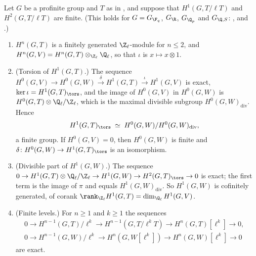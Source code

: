 \begin{proposition}\label{prop:galcoh:tvw}
Let $G$ be a profinite group and $T$ as in , and suppose that $H^1(G,T/\ell T)$ and $H^2(G,T/\ell T)$ are finite. (This holds for $G=G_{\F_q}$,
$G_\R$, $G_{\Q_p}$ and $G_{\Q,S}$: ,  and .)
\begin{enumerate}[label=(\roman*)]
\item $H^n(G,T)$ is a finitely generated $\Z_\ell$-module for $n\le2$, and $H^n(G,V)=H^n(G,T)\otimes_{\Z_\ell}\Q_\ell$, so that $\iota$ is $x\mapsto x\otimes1$.
\item (Torsion of $H^1(G,T)$.) The sequence $H^0(G,V)\to H^0(G,W)\xrightarrow{\ \delta\ }H^1(G,T)\xrightarrow{\ \iota\ }H^1(G,V)$ is exact, $\ker\iota=H^1(G,T)_{\tors}$, and the
image of $H^0(G,V)$ in $H^0(G,W)$ is $H^0(G,T)\otimes\Q_\ell/\Z_\ell$, which is the maximal divisible subgroup $H^0(G,W)_{\mathrm{div}}$. Hence
\[
H^1(G,T)_{\tors}\;\simeq\;H^0(G,W)/H^0(G,W)_{\mathrm{div}},
\]
a finite group. If $H^0(G,V)=0$, then $H^0(G,W)$ is finite and $\delta\colon H^0(G,W)\to H^1(G,T)_{\tors}$ is an isomorphism.
\item (Divisible part of $H^1(G,W)$.) The sequence $0\to H^1(G,T)\otimes\Q_\ell/\Z_\ell\to H^1(G,W)\to H^2(G,T)_{\tors}\to0$ is exact; the first term is the image of
$\pi$ and equals $H^1(G,W)_{\mathrm{div}}$. So $H^1(G,W)$ is cofinitely generated, of corank $\rank_{\Z_\ell}H^1(G,T)=\dim_{\Q_\ell}H^1(G,V)$.
\item (Finite levels.) For $n\ge1$ and $k\ge1$ the sequences
\begin{gather*}
0\to H^{n-1}(G,T)/\ell^k\to H^{n-1}(G,T/\ell^kT)\to H^n(G,T)[\ell^k]\to0,\\
0\to H^{n-1}(G,W)/\ell^k\to H^n(G,W[\ell^k])\to H^n(G,W)[\ell^k]\to0
\end{gather*}
are exact.
\end{enumerate}
\end{proposition}

